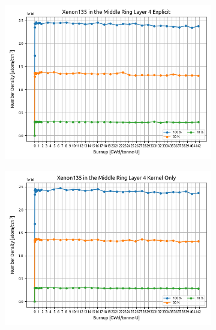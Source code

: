 \documentclass[letterpaper]{physor2024}
\begin{document}
\begin{figure}[!h]
    \centering
    \begin{subfigure}{0.495\linewidth}
        \centering
        \includegraphics[width=\linewidth]{figures/expl_xe135.png}
    \end{subfigure}
    \begin{subfigure}{0.495\linewidth}
        \centering
        \includegraphics[width=\linewidth]{figures/kern_xe135.png}
    \end{subfigure}
    \begin{subfigure}{0.495\linewidth}
        \centering

\end{subfigure}
\end{figure}
\end{document}
